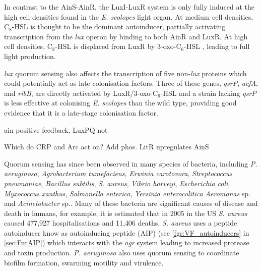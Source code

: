 In contrast to the AinS-AinR, the LuxI-LuxR system is only fully induced at the high cell densities found in the \textit{E. scolopes} light organ. At medium cell densities, C$_8$-HSL  is thought to be the dominant autoinducer, partially activating transcription from the \textit{lux} operon by binding to both AinR and LuxR\cite{Lupp2003}. At high cell densities, C$_8$-HSL  is displaced from LuxR by 3-oxo-C$_6$-HSL , leading to full light production.

\textit{lux} quorum sensing also affects the transcription of five non-\textit{lux} proteins which could potentially act as late colonisation factors\cite{Callahan2000,Qin2007}. Three of these genes, \textit{qsrP}, \textit{acfA}, and \textit{ribB}, are directly activated by LuxR/3-oxo-C$_6$-HSL\cite{Qin2007} and a strain lacking \textit{qsrP} is less effective at colonising \textit{E. scolopes} than the wild type, providing good evidence that it is a late-stage colonisation factor\cite{Callahan2000}.



ain positive feedback, LuxPQ not\cite{Lupp2004}

Which do CRP and Arc act on?
Add phos.
LitR upregulates AinS\cite{Lupp2004}





Quorum sensing has since been observed in many species of bacteria, including \textit{P. aeruginosa}, \textit{Agrobacterium tumefaciens}, \textit{Erwinia carotovora}, \textit{Streptococcus pneumoniae}, \textit{Bacillus subtilis}, \textit{S. aureus}, \textit{Vibrio harveyi}, \textit{Escherichia coli}, \textit{Myxococcus xanthus}, \textit{Salmonella enterica}, \textit{Yersinia enterocolitica}  \textit{Aeromonas} sp. and \textit{Acinetobacter} sp.\cite{Miller2001,Fuqua1994,Waters2005,Atkinson2006,Chan2011,Sauer2002,Michael2001,Ahmer2004,Nealson1970}. 
Many of these bacteria are significant causes of disease and death in humans, for example, it is estimated that in 2005 in the US \textit{S. aureus} caused 477,927 hospitalisations and 11,406 deaths\cite{Klein2007}. \textit{S. aureus} uses a peptide autoinducer know as autoinducing peptide (AIP) (see \ref{fgr:VF_autoinducers} in \ref{sec:FutAIP}) which interacts with the \textit{agr} system leading to increased protease and toxin production\cite{Antunes2010}. \textit{P. aeruginosa} also uses quorum sensing to coordinate biofilm formation, swarming motility and virulence.






